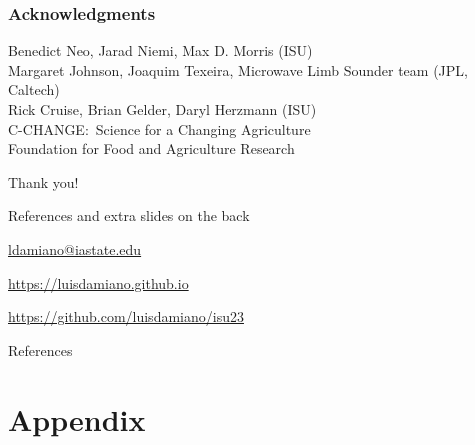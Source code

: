 \documentclass{snedecorbeamer}
\begin{document}
\begin{frame}[c]
  \frametitle{Acknowledgments}
  \centering

  {\small
    Benedict Neo, Jarad Niemi, Max D. Morris (ISU) \\
    Margaret Johnson, Joaquim Texeira, Microwave Limb Sounder team
    (JPL, Caltech) \\
    Rick Cruise, Brian Gelder, Daryl Herzmann (ISU) \\
    C-CHANGE:~Science for a Changing Agriculture \\
    Foundation for Food and Agriculture Research
  }

  \vfill

  {\huge Thank you!}

  \vfill

  {\tiny References and extra slides on the back}

  \href{ldamiano@iastate.edu}{
    ldamiano@iastate.edu}

  \href{https://luisdamiano.github.io}{
    https://luisdamiano.github.io}

  \href{https://github.com/luisdamiano/isu23}{
    https://github.com/luisdamiano/isu23}
\end{frame}

\appendix
{}
\begin{frame}[allowframebreaks]{References}
  \tiny
  
  
\end{frame}

\section{Appendix}
\end{document}
